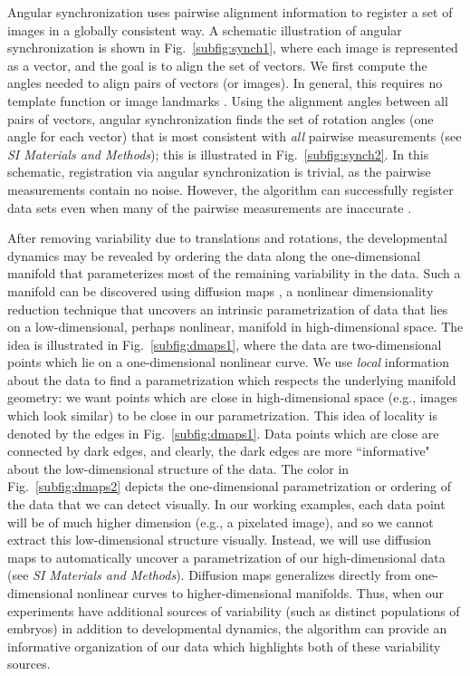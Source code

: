 \documentclass{pnastwo}
\newcommand{\SI}[0]{{\it SI Materials and Methods}}
\newcommand{\fig}[0]{Fig.}
\begin{document}
\begin{article}
Angular synchronization uses pairwise alignment information to register a set of images in a globally consistent way.
%
A schematic illustration of angular synchronization is shown in \fig~\ref{subfig:synch1}, where each image is represented as a vector, and the goal is to align the set of vectors.
%
We first compute the angles needed to align pairs of vectors (or images).  
%
In general, this requires no template function \cite{ahuja2007template} or image landmarks \cite{ian1998statistical}.
%
Using the alignment angles between all pairs of vectors, angular synchronization finds the set of rotation angles (one angle for each vector) that is most consistent with {\it all} pairwise measurements (see \SI); this is illustrated in \fig~\ref{subfig:synch2}.
%
In this schematic, registration via angular synchronization is trivial, as the pairwise measurements contain no noise.
%
However, the algorithm can successfully register data sets even when many of the pairwise measurements are inaccurate \cite{singer2011angular}.
%

%
After removing variability due to translations and rotations, the developmental dynamics may be revealed by ordering the data along the one-dimensional manifold that parameterizes most of the remaining variability in the data.
%
Such a manifold can be discovered using diffusion maps \cite{coifman2005geometric}, a nonlinear dimensionality reduction technique that uncovers an intrinsic parametrization of data that lies on a low-dimensional, perhaps nonlinear, manifold in high-dimensional space.
%
The idea is illustrated in \fig~\ref{subfig:dmaps1}, where the data are two-dimensional points which lie on a one-dimensional nonlinear curve.
%
We use {\it local} information about the data to find a parametrization  which respects the underlying manifold geometry: we want points which are close in high-dimensional space (e.g., images which look similar) to be close in our parametrization.
%
This idea of locality is denoted by the edges in \fig~\ref{subfig:dmaps1}.
%
Data points which are close are connected by dark edges, and clearly, the dark edges are more ``informative" about the low-dimensional structure of the data.
%
The color in \fig~\ref{subfig:dmaps2} depicts the one-dimensional parametrization or ordering of the data that we can detect visually.
%
In our working examples, each data point will be of much higher dimension (e.g., a pixelated image), and so we cannot extract this low-dimensional structure visually.
%
Instead, we will use diffusion maps to automatically uncover a parametrization of our high-dimensional data (see \SI).
%
Diffusion maps generalizes directly from one-dimensional nonlinear curves to higher-dimensional manifolds.
%
Thus, when our experiments have additional sources of variability (such as distinct populations of embryos) in addition to developmental dynamics, the algorithm can provide an informative organization of our data which highlights both of these variability sources.


\end{article}
\end{document}
